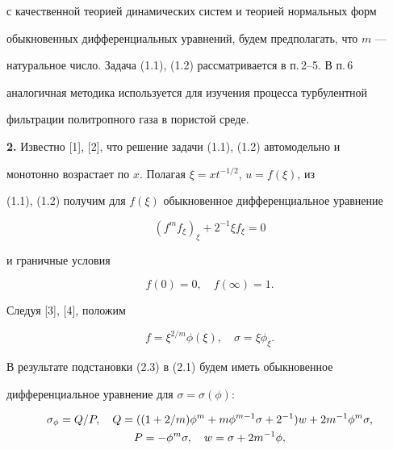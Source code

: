 с качественной теорией динамических систем и теорией нормальных форм 


обыкновенных дифференциальных уравнений, будем предполагать, что $m$ --- 


натуральное число. Задача (1.1), (1.2) рассматривается в п.\,2--5. В п.\,6 


аналогичная методика используется для изучения процесса турбулентной 


фильтрации политропного газа в пористой среде. 


\medskip 


\addtocounter{section}{1} 


\setcounter{equation}{0}


 


{\bf 2.} Известно [1], [2], что решение задачи (1.1), (1.2) автомодельно и 


монотонно возрастает по $x$. Полагая $\xi=xt^{-1/2}$, $u=f(\xi)$, из 


(1.1), (1.2) получим для $f(\xi)$ обыкновенное дифференциальное уравнение 


\begin{equation} 


(f^m f_\xi)_\xi+2^{-1}\xi f_\xi=0 


\end{equation} 


и граничные условия 


\begin{equation} 


f(0)=0,\quad f(\infty)=1. 


\end{equation} 


Следуя [3], [4], положим 


\begin{equation} 


f=\xi^{2/m}\phi(\xi),\quad \sigma=\xi \phi_\xi. 


\end{equation} 


В результате подстановки (2.3) в (2.1) будем иметь обыкновенное 


дифференциальное уравнение для $\sigma=\sigma(\phi)$: 


\begin{gather} 


\sigma_\phi=Q/P,\quad Q=((1+2/m)\phi^m+m\phi^{m-1} 


\sigma+2^{-1})w+2m^{-1}\phi^m\sigma,\\ 


P=-\phi^m\sigma,\quad w=\sigma+2m^{-1}\phi,\notag 


\end{gather} 



